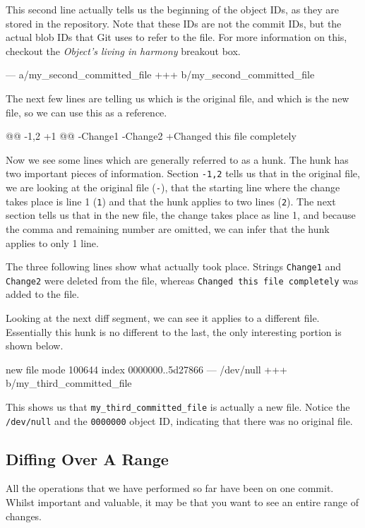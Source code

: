 This second line actually tells us the beginning of the object IDs, as they are stored in the repository.  Note that these IDs are not the commit IDs, but the actual blob IDs that Git uses to refer to the file.  For more information on this, checkout the \emph{Object's living in harmony} breakout box.

\begin{code}
--- a/my_second_committed_file
+++ b/my_second_committed_file
\end{code}

The next few lines are telling us which is the original file, and which is the new file, so we can use this as a reference.

\begin{code}
@@ -1,2 +1 @@
-Change1
-Change2
+Changed this file completely
\end{code}

Now we see some lines which are generally referred to as a hunk.  The hunk has two important pieces of information.  Section \texttt{-1,2} tells us that in the original file, we are looking at the original file (\texttt{-}), that the starting line where the change takes place is line 1 (\texttt{1}) and that the hunk applies to two lines (\texttt{2}).  The next section tells us that in the new file, the change takes place as line 1, and because the comma and remaining number are omitted, we can infer that the hunk applies to only 1 line.

The three following lines show what actually took place.  Strings \texttt{Change1} and \texttt{Change2} were deleted from the file, whereas \texttt{Changed this file completely} was added to the file.

Looking at the next diff segment, we can see it applies to a different file.  Essentially this hunk is no different to the last, the only interesting portion is shown below.

\begin{code}
new file mode 100644
index 0000000..5d27866
--- /dev/null
+++ b/my_third_committed_file
\end{code}

This shows us that \texttt{my\_third\_committed\_file} is actually a new file.  Notice the \texttt{/dev/null} and the \texttt{0000000} object ID, indicating that there was no original file.

\subsection{Diffing Over A Range}
All the operations that we have performed so far have been on one commit.  Whilst important and valuable, it may be that you want to see an entire range of changes.  

